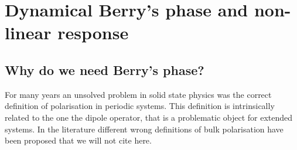 \section{Dynamical Berry's phase and non-linear response} 
\label{chapterberry}
\subsection{Why do we need Berry's phase?}
For many years an unsolved problem in solid state physics was the correct definition of polarisation in periodic systems.
This definition is intrinsically related to the one the dipole operator, that is a problematic object for extended systems.
In the literature different wrong definitions of bulk polarisation have been proposed that we will not cite here\cite{restanotes}.
\label{polisolated}
